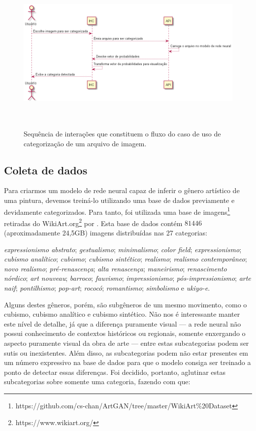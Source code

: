 \documentclass[12pt, a4paper]{article}
\begin{document}
\begin{figure}[H]
	\centering
	\includegraphics[width=\textwidth, height=8cm, keepaspectratio=true]{diagrams/sequence/Seq}
	\caption{Sequência de interações que constituem o fluxo do caso de uso de categorização de um arquivo de imagem.}
\end{figure}

\subsection{Coleta de dados}
Para criarmos um modelo de rede neural capaz de inferir o gênero artístico de uma pintura, devemos treiná-lo utilizando uma base de dados previamente e devidamente categorizados. Para tanto, foi utilizada uma base de imagens\footnote{https://github.com/cs-chan/ArtGAN/tree/master/WikiArt\%20Dataset} retiradas do WikiArt.org\footnote{https://www.wikiart.org/} por \cite{icip2016}. Esta base de dados contém $81446$ (aproximadamente 24,5GB) imagens distribuídas nas 27 categorias: 

\emph{expressionismo abstrato}; 
\emph{gestualismo}; 
\emph{minimalismo}; 
\emph{color field}; 
\emph{expressionismo}; 
\emph{cubismo analítico}; 
\emph{cubismo}; 
\emph{cubismo sintético}; 
\emph{realismo}; 
\emph{realismo contemporâneo}; 
\emph{novo realismo}; 
\emph{pré-renascença}; 
\emph{alta renascença}; 
\emph{maneirismo}; 
\emph{renascimento nórdico}; 
\emph{art nouveau}; 
\emph{barroco}; 
\emph{fauvismo}; 
\emph{impressionismo}; 
\emph{pós-impressionismo}; 
\emph{arte naif}; 
\emph{pontilhismo}; 
\emph{pop-art}; 
\emph{rococó}; 
\emph{romantismo}; 
\emph{simbolismo} e
\emph{ukiyo-e}.

Alguns destes gêneros, porém, são subgêneros de um mesmo movimento, como o cubismo, cubismo analítico e cubismo sintético. Não nos é interessante manter este nível de detalhe, já que a diferença puramente visual --- a rede neural não possui conhecimento de contextos históricos ou regionais, somente enxergando o aspecto puramente visual da obra de arte --- entre estas subcategorias podem ser sutis ou inexistentes. Além disso, as subcategorias podem não estar presentes em um número expressivo na base de dados para que o modelo consiga ser treinado a ponto de detectar essas diferenças. Foi decidido, portanto, aglutinar estas subcategorias sobre somente uma categoria, fazendo com que:
\end{document}
